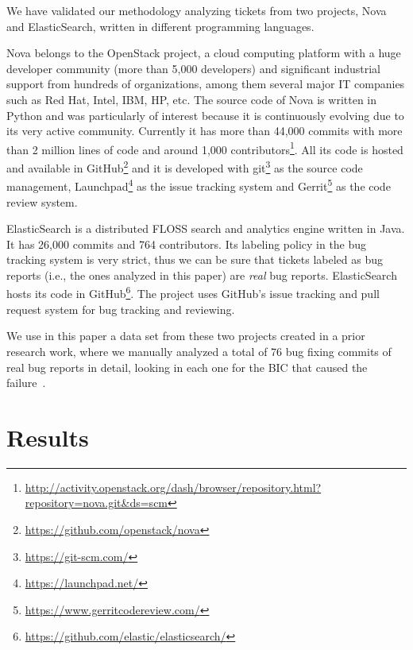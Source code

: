 \documentclass[10pt, conference]{IEEEtran}
\begin{document}
We have validated our methodology analyzing tickets from two projects, Nova and ElasticSearch, written in different programming languages. %

Nova belongs to the OpenStack project, a cloud computing platform with a huge developer community (more than 5,000 developers) and significant industrial support from hundreds of organizations, among them several major IT companies such as Red Hat, Intel, IBM, HP, etc. The source code of Nova is written in Python and was particularly of interest because it is continuously evolving due to its very active community. Currently it has more than 44,000 commits with more than 2 million lines of code and around 1,000 contributors\footnote{\url{http://activity.openstack.org/dash/browser/repository.html?repository=nova.git&ds=scm}}. All its code is hosted and available in GitHub\footnote{\url{https://github.com/openstack/nova}} and it is developed with git\footnote{\url{https://git-scm.com/}} as the source code management, Launchpad\footnote{\url{https://launchpad.net/}} as the issue tracking system and Gerrit\footnote{\url{https://www.gerritcodereview.com/}} as the code review system.

ElasticSearch is a distributed FLOSS search and analytics engine written in Java. It has 26,000 commits and 764 contributors. Its labeling policy in the bug tracking system is very strict, thus we can be sure that tickets labeled as bug reports (i.e., the ones analyzed in this paper) are \emph{real} bug reports. ElasticSearch hosts its code in GitHub\footnote{\url{https://github.com/elastic/elasticsearch/}}. The project uses GitHub's issue tracking and pull request system for bug tracking and reviewing.

We use in this paper a data set from these two projects created in a prior research work, where we manually analyzed a total of 76 bug fixing commits of real bug reports in detail, looking in each one for the BIC that caused the failure~\cite{gema2016doctoral}. %


\section{Results}
\label{sec:results}
\end{document}
